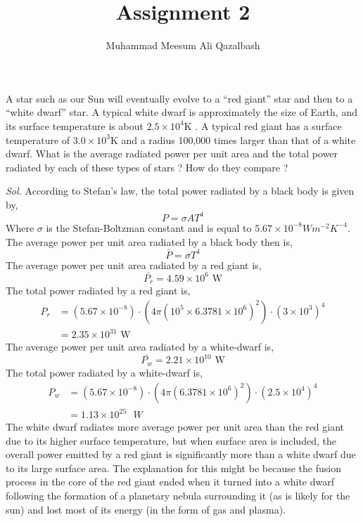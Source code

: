 \documentclass{article}
\title{Assignment 2}
\author{Muhammad Meesum Ali Qazalbash}
\theoremstyle{mytheoremstyle}
\theoremstyle{mytheoremstyle}
\theoremstyle{myproblemstyle}
\begin{document}
\maketitle

\begin{problem}
A star such as our Sun will eventually evolve to a “red giant” star and then to a “white dwarf”
star. A typical white dwarf is approximately the size of Earth, and its surface temperature is about
\(2.5 \times 10^4\)K . A typical red giant has a surface temperature of \(3.0 \times 10^3\)K and a radius 100,000 times larger than that of a white dwarf. What is the average radiated power per unit area and the total power radiated by each of these types of stars ? How do they compare ?
\end{problem}
\textit{ Sol. } According to Stefan's law, the total power radiated by a black body is given by,
\[P  = \sigma AT^4\]
Where \(\sigma\) is the Stefan-Boltzman constant and is equal to \(5.67 \times 10^{-8} Wm^{-2}K^{-4}\).
The average power per unit area radiated by a black body then is,
\[\bar{P} = \sigma T^4\]
The average power per unit area radiated by a red giant is,
\[\bar{P_{r}} = 4.59\times 10^6 \text{ W}\]
The total power radiated by a red giant is,
\begin{align*}
	P_{r} & = \left(5.67 \times 10^{-8}\right) \cdot \left(4\pi \left(10^5 \times 6.3781\times10^6\right)^2\right) \cdot \left(3\times 10^{3}\right)^4 \\
	      & = 2.35\times 10^{31} \text{ W}
\end{align*}
The average power per unit area radiated by a white-dwarf is,
\[\bar{P_{w}} = 2.21\times 10^{10} \text{ W}\]
The total power radiated by a white-dwarf is,
\begin{align*}
	P_{w} & = \left(5.67 \times 10^{-8}\right) \cdot \left(4\pi \left(6.3781\times10^6\right)^2\right) \cdot \left(2.5\times 10^{4}\right)^4 \\
	      & =1.13 \times 10^{25} \text{ }W
\end{align*}
The white dwarf radiates more average power per unit area than the red giant due to its higher surface temperature, but when surface area is included, the overall power emitted by a red giant is significantly more than a white dwarf due to its large surface area. The explanation for this might be because the fusion process in the core of the red giant ended when it turned into a white dwarf following the formation of a planetary nebula surrounding it (as is likely for the sun) and lost most of its energy (in the form of gas and plasma).
\end{document}
